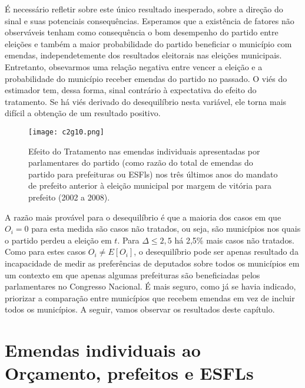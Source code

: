 É necessário refletir sobre este único resultado inesperado, sobre a direção do sinal e suas potenciais consequências. Esperamos que a existência de fatores não observáveis tenham como consequência o bom desempenho do partido entre eleições e também a maior probabilidade do partido beneficiar o município com emendas, independetemente dos resultados eleitorais nas eleições municipais. Entretanto, obsevarmos uma relação negativa entre vencer a eleição e a probabilidade do município receber emendas do partido no passado. O viés do estimador tem, dessa forma, sinal contrário à expectativa do efeito do tratamento. Se há viés derivado do desequilíbrio nesta variável, ele torna mais difícil a obtenção de um resultado positivo.

\begin{figure}[htp]
	\centering
	\texttt{[image: c2g10.png]}
	\caption{Efeito do Tratamento nas emendas individuais apresentadas por parlamentares do partido (como razão do total de emendas do partido para prefeituras ou ESFls) nos três últimos anos do mandato de prefeito anterior à eleição municipal por margem de vitória para prefeito (2002 a 2008).}
	\label{fig:c2g10}
\end{figure}

A razão mais provável para o desequilíbrio é que a maioria dos casos em que $O_{i}=0$ para esta medida são casos não tratados, ou seja, são municípios nos quais o partido perdeu a eleição em $t$. Para $\Delta \leq 2,5$ há 2,5\% mais casos não tratados. Como para estes casos $O_{i} \ne E[O_{i}]$, o desequilíbrio pode ser apenas resultado da incapacidade de medir as preferências de deputados sobre todos os municípios em um contexto em que apenas algumas prefeituras são beneficiadas pelos parlamentares no Congresso Nacional. É mais seguro, como já se havia indicado, priorizar a comparação entre municípios que recebem emendas em vez de incluir todos os municípios. A seguir, vamos observar os resultados deste capítulo. 

\section{Emendas individuais ao Orçamento, prefeitos e ESFLs}

